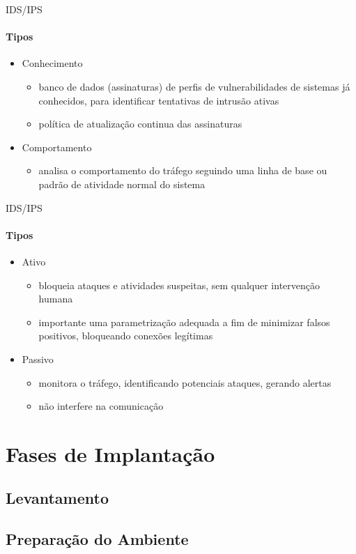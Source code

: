\documentclass[aspectratio=169]{beamer}
\begin{document}
\begin{frame}{IDS/IPS}
	\framesubtitle{Tipos}
	\begin{itemize}
		\item Conhecimento
			\begin{itemize}
				\item banco de dados (assinaturas) de perfis de vulnerabilidades de sistemas já conhecidos, para identificar tentativas de intrusão ativas
				\item política de atualização continua das assinaturas
			\end{itemize}
		\item Comportamento
			\begin{itemize}
				\item analisa o comportamento do tráfego seguindo uma linha de base ou padrão de atividade normal do sistema
			\end{itemize}
	\end{itemize}		
\end{frame}

\begin{frame}{IDS/IPS}
	\framesubtitle{Tipos}
	\begin{itemize}
		\item Ativo
			\begin{itemize}
				\item bloqueia ataques e atividades suspeitas, sem qualquer intervenção humana
				\item importante uma parametrização adequada a fim de minimizar falsos positivos, bloqueando conexões legítimas
			\end{itemize}
		\item Passivo
			\begin{itemize}
				\item monitora o tráfego, identificando potenciais ataques, gerando alertas
				\item não interfere na comunicação
			\end{itemize}
	\end{itemize}
\end{frame}
\section{Fases de Implantação}
\subsection{Levantamento}
\subsection{Preparação do Ambiente}
\end{document}
